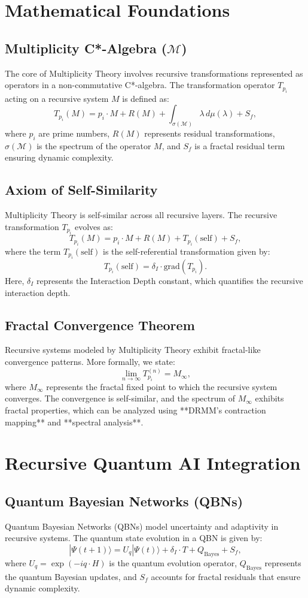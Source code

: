 \documentclass{article}
\theoremstyle{plain}
\begin{document}
\begin{itemize}
\section{Mathematical Foundations}

\subsection{Multiplicity C*-Algebra (\( \mathcal{M} \))}
The core of Multiplicity Theory involves recursive transformations represented as operators in a non-commutative C*-algebra. The transformation operator \( T_{p_i} \) acting on a recursive system \( M \) is defined as:
\[
T_{p_i}(M) = p_i \cdot M + R(M) + \int_{\sigma(\mathcal{M})} \lambda \, d\mu(\lambda) + S_f,
\]
where \( p_i \) are prime numbers, \( R(M) \) represents residual transformations, \( \sigma(\mathcal{M}) \) is the spectrum of the operator \( M \), and \( S_f \) is a fractal residual term ensuring dynamic complexity.
\subsection{Axiom of Self-Similarity}
Multiplicity Theory is self-similar across all recursive layers. The recursive transformation \( T_{p_i} \) evolves as:
\[
T_{p_i}(M) = p_i \cdot M + R(M) + T_{p_i}(\text{self}) + S_f,
\]
where the term \( T_{p_i}(\text{self}) \) is the self-referential transformation given by:
\[
T_{p_i}(\text{self}) = \delta_I \cdot \text{grad}(T_{p_i}).
\]
Here, \( \delta_I \) represents the Interaction Depth constant, which quantifies the recursive interaction depth.
\subsection{Fractal Convergence Theorem}
Recursive systems modeled by Multiplicity Theory exhibit fractal-like convergence patterns. More formally, we state:
\[
\lim_{n \to \infty} T_{p_i}^{(n)} = M_\infty,
\]
where \( M_\infty \) represents the fractal fixed point to which the recursive system converges. The convergence is self-similar, and the spectrum of \( M_\infty \) exhibits fractal properties, which can be analyzed using **DRMM's contraction mapping** and **spectral analysis**.
\section{Recursive Quantum AI Integration}

\subsection{Quantum Bayesian Networks (QBNs)}
Quantum Bayesian Networks (QBNs) model uncertainty and adaptivity in recursive systems. The quantum state evolution in a QBN is given by:
\[
|\Psi(t+1)\rangle = U_q |\Psi(t)\rangle + \delta_I \cdot T + Q_\text{Bayes} + S_f,
\]
where \( U_q = \exp(-i q \cdot H) \) is the quantum evolution operator, \( Q_\text{Bayes} \) represents the quantum Bayesian updates, and \( S_f \) accounts for fractal residuals that ensure dynamic complexity.


\end{itemize}
\end{document}
